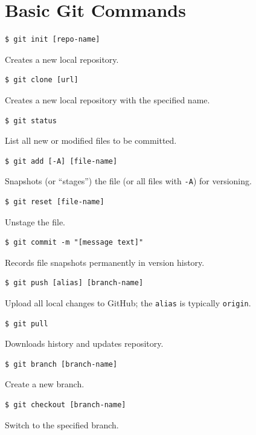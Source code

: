 \documentclass{tufte-handout}
\begin{document}
\vspace{5mm}
\section{Basic Git Commands}
\begin{lstlisting}[frame=single] 
$ git init [repo-name]
\end{lstlisting}
Creates a new local repository.

\vspace{3mm}
\begin{lstlisting}[frame=single] 
$ git clone [url]
\end{lstlisting}
Creates a new local repository with the specified name.

\vspace{3mm}
\begin{lstlisting}[frame=single] 
$ git status
\end{lstlisting}
List all new or modified files to be committed.

\vspace{3mm}
\begin{lstlisting}[frame=single] 
$ git add [-A] [file-name]
\end{lstlisting}
Snapshots (or ``stages'') the file (or all files with \texttt{-A}) for versioning.

\vspace{3mm}
\begin{lstlisting}[frame=single] 
$ git reset [file-name]
\end{lstlisting}
Unstage the file.

\vspace{3mm}
\begin{lstlisting}[frame=single] 
$ git commit -m "[message text]"
\end{lstlisting}
Records file snapshots permanently in version history.

\vspace{3mm}
\begin{lstlisting}[frame=single] 
$ git push [alias] [branch-name]
\end{lstlisting}
Upload all local changes to GitHub; the \texttt{alias} is typically \texttt{origin}.

\vspace{3mm}
\begin{lstlisting}[frame=single] 
$ git pull
\end{lstlisting}
Downloads history and updates repository.

\vspace{3mm}
\begin{lstlisting}[frame=single] 
$ git branch [branch-name]
\end{lstlisting}
Create a new branch.

\vspace{3mm}
\begin{lstlisting}[frame=single] 
$ git checkout [branch-name]
\end{lstlisting}
Switch to the specified branch.
\end{document}
